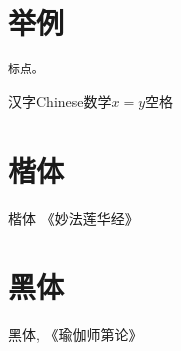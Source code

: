 \documentclass[11pt]{article}
\begin{document}
\section{举例}
\begin{verbatim}           
标点。                              
\end{verbatim}

汉字Chinese数学$x=y$空格

\section{楷体}  

\kai 楷体 《妙法莲华经》

\section{黑体}  

\hei 黑体, 《瑜伽师第论》
\end{document}
